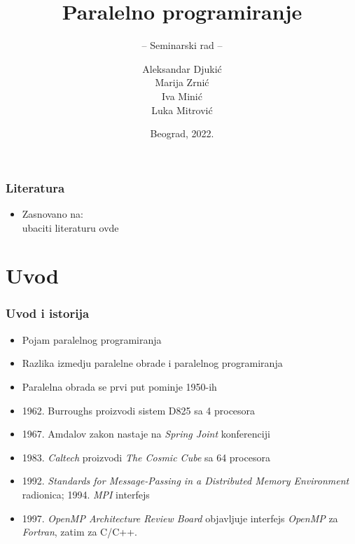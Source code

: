 \documentclass{beamer}
\title{Paralelno programiranje}
\subtitle{-- Seminarski rad --}
\author{Aleksandar Djukić \\Marija Zrnić \\Iva Minić \\Luka Mitrović}
\institute{Matematički fakultet\\Univerzitet u Beogradu}
\date{
	\footnotesize{Beograd, 2022.}	
}
\begin{document}
	\begin{frame}
		\thispagestyle{empty}
		\titlepage
	\end{frame}
	
	\addtocounter{framenumber}{-1}
	
	\begin{frame}[fragile]\frametitle{Literatura}
		\begin{itemize}
			\item Zasnovano na:\\
			ubaciti literaturu ovde
		\end{itemize}
	\end{frame}
	
	
	\section{Uvod}
	
	\begin{frame}[fragile]\frametitle{Uvod i istorija}
		\begin{itemize}	
			\item Pojam paralelnog programiranja
			\item Razlika izmedju paralelne obrade i paralelnog programiranja
			\bigskip
			\item Paralelna obrada se prvi put pominje 1950-ih
			\item 1962. Burroughs proizvodi sistem D825 sa 4 procesora
			\item 1967. Amdalov zakon nastaje na \emph{Spring Joint} konferenciji
			\item 1983. \emph{Caltech} proizvodi \emph{The Cosmic Cube} sa 64 procesora
			\bigskip
			\item 1992. \emph{Standards for Message-Passing in a Distributed Memory Environment} radionica; 1994. \emph{MPI} interfejs
			\item 1997. \emph{OpenMP Architecture Review Board} objavljuje interfejs \emph{OpenMP} za \emph{Fortran}, zatim za C/C++.
		\end{itemize}
	\end{frame}
	
	
\end{document}

